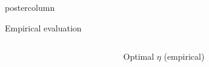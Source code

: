 \documentclass[final,hyperref={pdfpagelabels=false}]{beamer}
\begin{document}
\begin{frame}
\begin{columns}
\begin{column}{.49\textwidth}
\begin{beamercolorbox}[center,wd=\textwidth]{postercolumn}
\begin{minipage}[T]{.95\textwidth}
{\begin{block}{Empirical evaluation}
\begin{columns}
\begin{column}{.40\textwidth}
   \end{column}
   \begin{column}{.25\textwidth}
   \begin{center}
  {\tiny Optimal $\eta$ (empirical)}
    \vspace{-0.5em}


\end{center}
\end{column}
\end{columns}
\end{block}}
\end{minipage}
\end{beamercolorbox}
\end{column}
\end{columns}
\end{frame}
\end{document}

